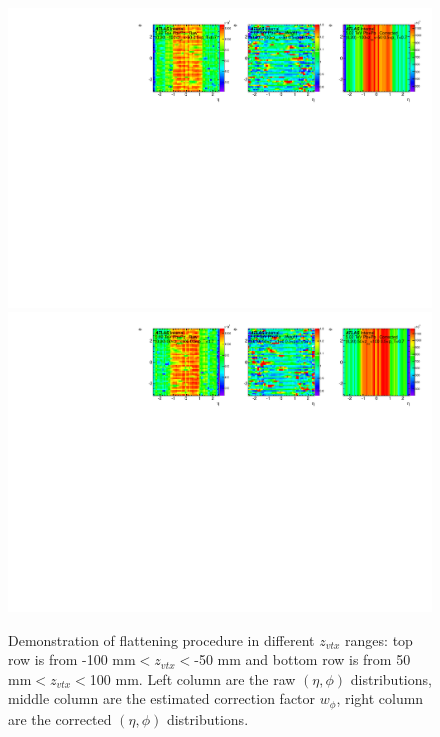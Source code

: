 \begin{figure}[H]
\centering
\includegraphics[width=.9\linewidth]{figs/sec_ana/cumuFlat_Cent0_Zvtx3_Chg0_Pt1.pdf}
\includegraphics[width=.9\linewidth]{figs/sec_ana/cumuFlat_Cent0_Zvtx6_Chg0_Pt1.pdf}
\caption{Demonstration of flattening procedure in different $z_{vtx}$ ranges: top row is from -100 mm$<z_{vtx}<$-50 mm and bottom row is from 50 mm$<z_{vtx}<$100 mm. Left column are the raw $(\eta,\phi)$ distributions, middle column are the estimated correction factor $w_{\phi}$, right column are the corrected $(\eta,\phi)$ distributions.}
\label{fig:cumuAna_FLAT_Zvtx}
\end{figure}

